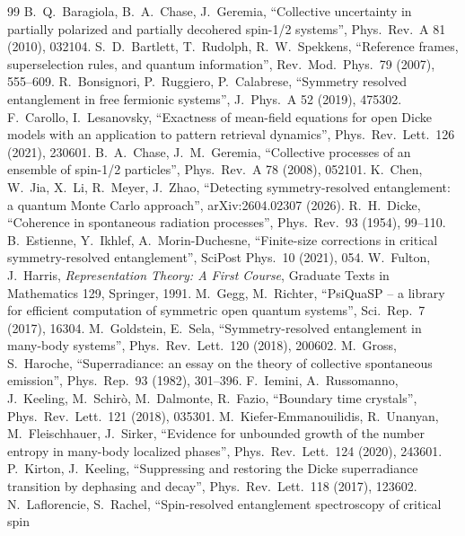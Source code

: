 \documentclass[11pt]{article}
\begin{document}
{\sloppy
\begin{thebibliography}{99}
 B.~Q.~Baragiola, B.~A.~Chase, J.~Geremia, ``Collective uncertainty in partially polarized
  and partially decohered spin-1/2 systems'', Phys.\ Rev.\ A 81 (2010), 032104.
 S.~D.~Bartlett, T.~Rudolph, R.~W.~Spekkens, ``Reference frames, superselection rules, and
  quantum information'', Rev.\ Mod.\ Phys.\ 79 (2007), 555--609.
 R.~Bonsignori, P.~Ruggiero, P.~Calabrese, ``Symmetry resolved entanglement in free fermionic
  systems'', J.\ Phys.\ A 52 (2019), 475302.
 F.~Carollo, I.~Lesanovsky, ``Exactness of mean-field equations for open Dicke models with an
  application to pattern retrieval dynamics'', Phys.\ Rev.\ Lett.\ 126 (2021), 230601.
 B.~A.~Chase, J.~M.~Geremia, ``Collective processes of an ensemble of spin-1/2 particles'',
  Phys.\ Rev.\ A 78 (2008), 052101.
 K.~Chen, W.~Jia, X.~Li, R.~Meyer, J.~Zhao, ``Detecting symmetry-resolved entanglement: a quantum
  Monte Carlo approach'', arXiv:2604.02307 (2026).
 R.~H.~Dicke, ``Coherence in spontaneous radiation processes'', Phys.\ Rev.\ 93 (1954), 99--110.
 B.~Estienne, Y.~Ikhlef, A.~Morin-Duchesne, ``Finite-size corrections in critical
  symmetry-resolved entanglement'', SciPost Phys.\ 10 (2021), 054.
 W.~Fulton, J.~Harris, \emph{Representation Theory: A First Course}, Graduate Texts in
  Mathematics 129, Springer, 1991.
 M.~Gegg, M.~Richter, ``PsiQuaSP -- a library for efficient computation of symmetric open
  quantum systems'', Sci.\ Rep.\ 7 (2017), 16304.
 M.~Goldstein, E.~Sela, ``Symmetry-resolved entanglement in many-body systems'',
  Phys.\ Rev.\ Lett.\ 120 (2018), 200602.
 M.~Gross, S.~Haroche, ``Superradiance: an essay on the theory of collective spontaneous
  emission'', Phys.\ Rep.\ 93 (1982), 301--396.
 F.~Iemini, A.~Russomanno, J.~Keeling, M.~Schir\`o, M.~Dalmonte, R.~Fazio, ``Boundary time
  crystals'', Phys.\ Rev.\ Lett.\ 121 (2018), 035301.
 M.~Kiefer-Emmanouilidis, R.~Unanyan, M.~Fleischhauer, J.~Sirker, ``Evidence for unbounded growth
  of the number entropy in many-body localized phases'', Phys.\ Rev.\ Lett.\ 124 (2020), 243601.
 P.~Kirton, J.~Keeling, ``Suppressing and restoring the Dicke superradiance transition by
  dephasing and decay'', Phys.\ Rev.\ Lett.\ 118 (2017), 123602.
 N.~Laflorencie, S.~Rachel, ``Spin-resolved entanglement spectroscopy of critical spin

\end{thebibliography}}
\end{document}
